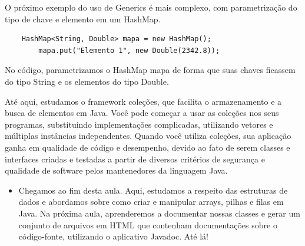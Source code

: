 \documentclass[11pt]{article}
\begin{document}
O próximo exemplo do uso de Generics é mais complexo, com parametrização do tipo de chave e elemento em um HashMap.

\begin{verbatim}
    HashMap<String, Double> mapa = new HashMap();
        mapa.put("Elemento 1", new Double(2342.8));
\end{verbatim}

No código, parametrizamos o HashMap mapa de forma que suas chaves ficassem do tipo String e os elementos do tipo Double.

Até aqui, estudamos o framework coleções, que facilita o armazenamento e a busca de elementos em Java. Você pode começar a usar as coleções nos seus programas, substituindo implementações complicadas, utilizando vetores e múltiplas instâncias independentes. Quando você utiliza coleções, sua aplicação ganha em qualidade de código e desempenho, devido ao fato de serem classes e interfaces criadas e testadas a partir de diversos critérios de segurança e qualidade de software pelos mantenedores da linguagem Java.

\begin{itemize}
\item Chegamos ao fim desta aula. Aqui, estudamos a respeito das estruturas de dados e abordamos sobre como criar e manipular arrays, pilhas e filas em Java. Na próxima aula, aprenderemos a documentar nossas classes e gerar um conjunto de arquivos em HTML que contenham documentações sobre o código-fonte, utilizando o aplicativo Javadoc. Até lá!
\end{itemize}
\end{document}
